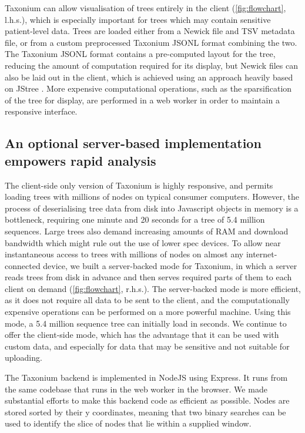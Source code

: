 \documentclass[twocolumn]{bioRxiv}
\begin{document}
Taxonium can allow visualisation of trees entirely in the client (\cref{fig:flowchart}, l.h.s.), which is especially important for trees which may contain sensitive patient-level data. Trees are loaded either from a Newick file and TSV metadata file, or from a custom preprocessed Taxonium JSONL format combining the two. The Taxonium JSONL format contains a pre-computed layout for the tree, reducing the amount of computation required for its display, but Newick files can also be laid out in the client, which is achieved using an approach heavily based on JStree \citep{jstree}. More expensive computational operations, such as the sparsification of the tree for display, are performed in a web worker in order to maintain a responsive interface.

\subsection*{An optional server-based implementation empowers rapid analysis}

The client-side only version of Taxonium is highly responsive, and permits loading trees with millions of nodes on typical consumer computers. However, the process of deserialising tree data from disk into Javascript objects in memory is a bottleneck, requiring one minute and 20 seconds for a tree of 5.4 million sequences. Large trees also demand increasing amounts of RAM and download bandwidth which might rule out the use of lower spec devices. To allow near instantaneous access to trees with millions of nodes on almost any internet-connected device, we built a server-backed mode for Taxonium, in which a server reads trees from disk in advance and then serves required parts of them to each client on demand (\cref{fig:flowchart}, r.h.s.). The server-backed mode is more efficient, as it does not require all data to be sent to the client, and the computationally expensive operations can be performed on a more powerful machine. Using this mode, a 5.4 million sequence tree can initially load in seconds. We continue to offer the client-side mode, which has the advantage that it can be used with custom data, and especially for data that may be sensitive and not suitable for uploading.



The Taxonium backend is implemented in NodeJS using Express. It runs from the same codebase that runs in the web worker in the browser. We made substantial efforts to make this backend code as efficient as possible. Nodes are stored sorted by their y coordinates, meaning that two binary searches can be used to identify the slice of nodes that lie within a supplied window.
\end{document}
